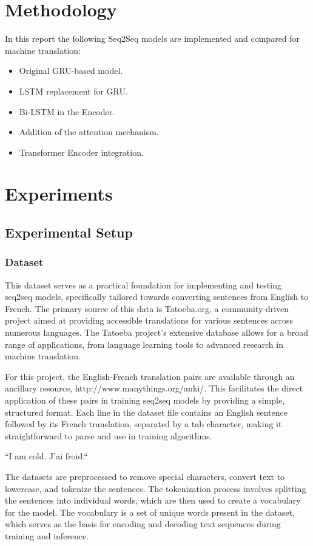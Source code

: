 \documentclass{article}
\begin{document}
\section{Methodology}
In this report the following Seq2Seq models are implemented and compared for machine translation:
\begin{itemize}
    \item Original GRU-based model.
    \item LSTM replacement for GRU.
    \item Bi-LSTM in the Encoder.
    \item Addition of the attention mechanism.
    \item Transformer Encoder integration.
\end{itemize}

\section{Experiments}
\subsection{Experimental Setup}
\subsubsection{Dataset}
This dataset serves as a practical foundation for implementing and testing seq2seq models, specifically tailored towards converting sentences from English to French. The primary source of this data is Tatoeba.org, a community-driven project aimed at providing accessible translations for various sentences across numerous languages. The Tatoeba project's extensive database allows for a broad range of applications, from language learning tools to advanced research in machine translation.

For this project, the English-French translation pairs are available through an ancillary resource, http://www.manythings.org/anki/. This facilitates the direct application of these pairs in training seq2seq models by providing a simple, structured format. Each line in the dataset file contains an English sentence followed by its French translation, separated by a tab character, making it straightforward to parse and use in training algorithms.

    ``I am cold.    J'ai froid.``

The datasets are preprocessed to remove special characters, convert text to lowercase, and tokenize the sentences. The tokenization process involves splitting the sentences into individual words, which are then used to create a vocabulary for the model. The vocabulary is a set of unique words present in the dataset, which serves as the basis for encoding and decoding text sequences during training and inference.
\end{document}
